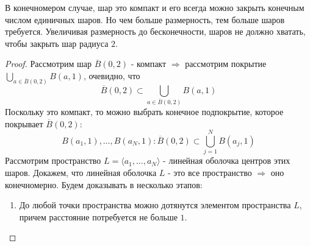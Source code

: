 \documentclass[12pt]{article}
\theoremstyle{definition}
\begin{document}
В конечномером случае, шар это компакт и его всегда можно закрыть конечным числом единичных шаров. Но чем больше размерность, тем больше шаров требуется. Увеличивая размерность до бесконечности, шаров не должно хватать, чтобы закрыть шар радиуса $2$.
\begin{proof}
	Рассмотрим шар $\overline{B}(0,2)$ - компакт $\Rightarrow$ рассмотрим покрытие $\textstyle \bigcup\limits_{a \in \overline{B}(0,2)} B(a,1)$, очевидно, что 
	$$
		\overline{B}(0,2) \subset \textstyle \bigcup\limits_{a \in \overline{B}(0,2)} B(a,1)
	$$
	Поскольку это компакт, то можно выбрать конечное подпокрытие, которое покрывает $\overline{B}(0,2)$: 
	$$
		B(a_1,1), \dotsc, B(a_N,1) \colon \overline{B}(0,2) \subset \textstyle \bigcup\limits_{j = 1}^{N}B(a_j,1)
	$$ 
	Рассмотрим пространство $L = \langle a_1, \dotsc, a_N\rangle$ - линейная оболочка центров этих шаров. Докажем, что линейная оболочка $L$ - это все пространство $\Rightarrow$ оно конечномерно. Будем доказывать в несколько этапов:
	\begin{enumerate}[label ={\arabic*)}]
		\item До любой точки пространства можно дотянутся элементом пространства $L$, причем расстояние потребуется не больше $1$. 
		

\end{enumerate}
\end{proof}
\end{document}
